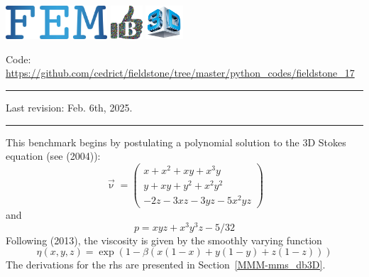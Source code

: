 \includegraphics[height=1.25cm]{images/pictograms/FEM}
\includegraphics[height=1.25cm]{images/pictograms/benchmark}
\includegraphics[height=1.25cm]{images/pictograms/3d}


%

\begin{center}
\inpython
{\small Code: \url{https://github.com/cedrict/fieldstone/tree/master/python_codes/fieldstone_17}}
\end{center}

\par\noindent\rule{\textwidth}{0.4pt}

Last revision: Feb. 6th, 2025.

\par\noindent\rule{\textwidth}{0.4pt}



This benchmark begins by postulating a polynomial solution to the 3D Stokes 
equation (see \textcite{dobo04} (2004)):
\begin{equation}
\vec{\upnu}
=
\left(
\begin{array}{c}
x+x^2+xy+x^3y \\
y + xy + y^2 + x^2 y^2\\
-2z - 3xz - 3yz - 5x^2 yz
\end{array}
\right)
\label{eqburrr}
\end{equation}
and
\begin{equation}
p = xyz + x^3 y^3z - 5/32
\end{equation}
Following \textcite{busa13} (2013), the viscosity
is given by the smoothly varying function
\begin{equation}
\eta(x,y,z)=\exp(1 - \beta(x(1 - x) + y(1 - y) + z(1 - z)))
\end{equation}
The derivations for the rhs are presented in Section~\ref{MMM-mms_db3D}.


